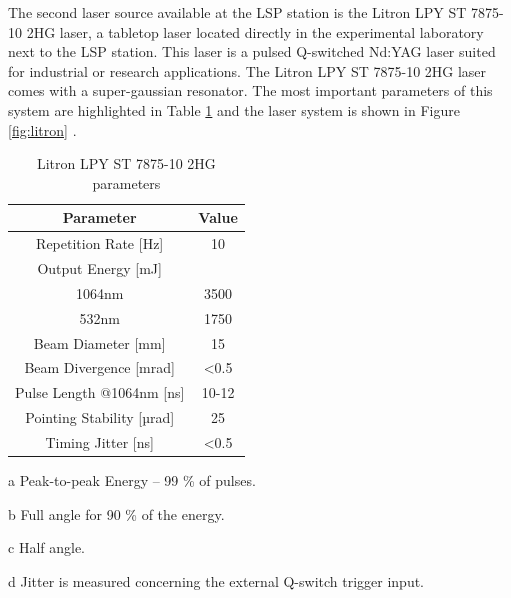 The second laser source available at the LSP station is the Litron LPY ST 7875-10 2HG laser, a tabletop laser located directly in the experimental laboratory next to the LSP station. This laser is a pulsed Q-switched Nd:YAG laser suited for industrial or research applications. The Litron  LPY ST 7875-10 2HG laser comes with a super-gaussian resonator. The most important parameters of this system are highlighted in Table \ref{tab:litronparameters} and the laser system is shown in Figure \ref{fig:litron} \cite{litron}. 


\begin{table}[h!] 
\centering
    \begin{threeparttable}
        \begin{tabular}{|c | c|} 
        \hline
            \textbf{Parameter} & \textbf{Value} \\ [0.5ex] 
        \hline
        Repetition Rate [Hz] & 10  \\ 
        \hline
            Output Energy [mJ] & \\
            1064nm & 3500 \\
            532nm & 1750 \\
        \hline
            Beam Diameter [mm] & 15 \tnote{a} \\
        \hline
            Beam Divergence [mrad] & \textless 0.5 \tnote{b} \\ 
        \hline
            Pulse Length @1064nm [ns] & 10-12 \\
        \hline
            Pointing Stability [µrad] & 25 \tnote{c} \\
        \hline
            Timing Jitter [ns] & \textless 0.5 \tnote{d}  \\
        \hline
        \end{tabular}
        \begin{tablenotes}
            \small
            \item[a] Peak-to-peak Energy -- 99 \% of pulses. 
            \item[b] Full angle for 90 \% of the energy.
            \item[c] Half angle.
            \item[d] Jitter is measured concerning the external Q-switch trigger input.
        \end{tablenotes}
        
    \end{threeparttable}
        \caption{Litron LPY ST 7875-10 2HG parameters \protect\cite{litronmanual}}
\label{tab:litronparameters}
\end{table}


